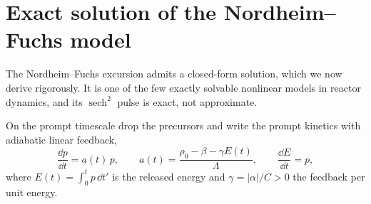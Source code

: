 


\section{Exact solution of the Nordheim--Fuchs model}
\label{sec:nf-exact}

The Nordheim--Fuchs excursion admits a closed-form solution, which we now derive
rigorously. It is one of the few exactly solvable nonlinear models in reactor
dynamics, and its $\operatorname{sech}^2$ pulse is exact, not approximate.

On the prompt timescale drop the precursors and write the prompt kinetics with
adiabatic linear feedback,
\begin{equation}
\frac{\dd p}{\dd t}=a(t)\,p,\qquad a(t)=\frac{\rho_0-\beta-\gamma E(t)}{\Lambda},
\qquad \frac{\dd E}{\dd t}=p,
\label{eq:nf-system}
\end{equation}
where $E(t)=\int_0^t p\,\dd t'$ is the released energy and $\gamma=|\alpha|/C>0$
the feedback per unit energy.

